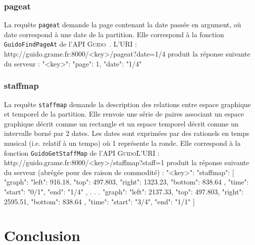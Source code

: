 \documentclass{article}
\newenvironment{code}		{\vspace{-2mm} \fontsize{8.5pt}{12pt}\selectfont \verbatim}{\endverbatim\vspace{-2mm}}
\newenvironment{mcode}		{\vspace{-2mm} \fontsize{10pt}{12pt}\selectfont \verbatim}{\endverbatim\vspace{-2mm}}
\newcommand{\guido}		{\textsc{Guido}}
\begin{document}
\subsubsection{pageat}
La requête \verb=pageat= demande la page contenant la date passée en argument, où \og{}date\fg{} correspond à une date de la partition. Elle correspond à la fonction \break \verb=GuidoFindPageAt= de l'API \guido\ . L'URI :
\begin{code}
 http://guido.grame.fr:8000/<key>/pageat?date=1/4
\end{code}
produit la réponse suivante du serveur :
\begin{mcode}
  {
    "<key>": {
      "page": 1,
      "date": "1/4"
    }
  }
\end{mcode}

\subsubsection{staffmap}\label{subsection:staffmap}
La requête \verb=staffmap= demande la description des relations entre espace graphique et temporel de la partition. Elle renvoie une série de paires associant un espace graphique décrit comme un rectangle et un espace temporel décrit comme un intervalle borné par 2 dates. Les dates sont exprimées par des rationels en temps musical (i.e. relatif à un tempo) où 1 représente la ronde. Elle correspond à la fonction \verb=GuidoGetStaffMap= de l'API \guido\. L'URI :
\begin{code}
  http://guido.grame.fr:8000/<key>/staffmap?staff=1
\end{code}
produit la réponse suivante du serveur (abrégée pour des raison de commodité) :
\begin{mcode}
  {
    "<key>": {
      "staffmap": [
        {
          "graph": {
            "left": 916.18,
            "top": 497.803,
            "right": 1323.23,
            "bottom": 838.64
          },
          "time": {
            "start": "0/1",
            "end": "1/4"
          }
        },
        .
        .
        .
        {
          "graph": {
            "left": 2137.33,
            "top": 497.803,
            "right": 2595.51,
            "bottom": 838.64
          },
          "time": {
            "start": "3/4",
            "end": "1/1"
          }
        }
      ]
    }
  }
\end{mcode}

\section{Conclusion}
\end{document}
